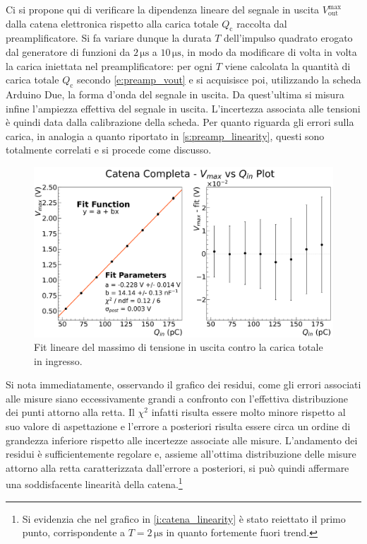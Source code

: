 \documentclass[a4paper,11pt]{article} %
\begin{document}
Ci si propone qui di verificare la dipendenza lineare del segnale in uscita $V_{\text{out}}^{\text{max}}$ dalla catena
elettronica rispetto alla carica totale $Q_{\text{c}}$ raccolta dal preamplificatore. Si fa variare dunque la durata $T$
dell'impulso quadrato erogato dal generatore di funzioni da $2\,\si{\us}$ a $10\,\si{\us}$, in modo da modificare di
volta in volta la carica iniettata nel preamplificatore: per ogni $T$ viene calcolata la quantità di carica totale
$Q_{\text{c}}$ secondo \autoref{e:preamp_vout} e si acquisisce poi, utilizzando la scheda Arduino Due, la forma d'onda
del segnale in uscita. Da quest'ultima si misura infine l'ampiezza effettiva del segnale in uscita. L'incertezza
associata alle tensioni è quindi data dalla calibrazione della scheda. Per quanto riguarda gli errori sulla carica, in
analogia a quanto riportato in \autoref{s:preamp_linearity}, questi sono totalmente correlati e si procede come
discusso.
\begin{figure}[H]
	\centering
	\includegraphics[width=0.9\linewidth]{../Plots/Catena/catena_linearity.png}
	\caption{\small Fit lineare del massimo di tensione in uscita contro la carica totale in ingresso.}
	\label{i:catena_linearity}
\end{figure}
\noindent Si nota immediatamente, osservando il grafico dei residui, come gli errori associati alle misure siano
eccessivamente grandi a confronto con l'effettiva distribuzione dei punti attorno alla retta. Il $\chi^2$ infatti
risulta essere molto minore rispetto al suo valore di aspettazione e l'errore a posteriori risulta essere circa un
ordine di grandezza inferiore rispetto alle incertezze associate alle misure. L'andamento dei residui è sufficientemente
regolare e, assieme all'ottima distribuzione delle misure attorno alla retta caratterizzata dall'errore a posteriori, si
può quindi affermare una soddisfacente linearità della catena.\footnote{Si evidenzia che nel grafico in
\autoref{i:catena_linearity} è stato reiettato il primo punto, corrispondente a $T=2\,\si{\us}$ in quanto fortemente
fuori trend.}
\end{document}
